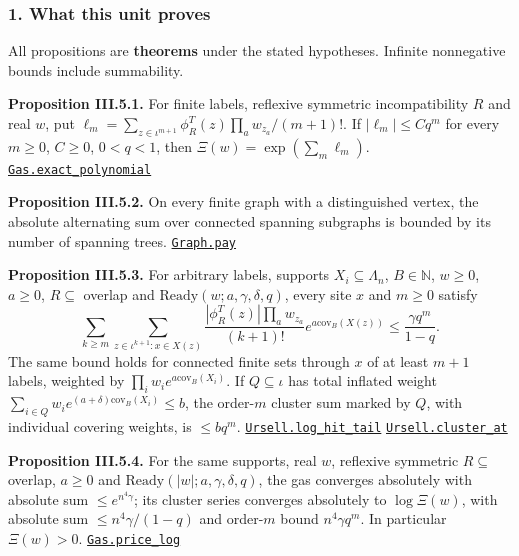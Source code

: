\documentclass[
  letterpaper,
  11pt]{article}
\begin{document}
\subsubsection{1. What this unit proves}\label{what-this-unit-proves-7}

All propositions are \textbf{theorems} under the stated hypotheses.
Infinite nonnegative bounds include summability.

\textbf{Proposition III.5.1.} For finite labels, reflexive symmetric
incompatibility \(R\) and real \(w\), put
\(\ell_m=\sum_{z\in\iota^{m+1}}\phi_R^T(z)\prod_aw_{z_a}/(m+1)!\). If
\(|\ell_m|\le Cq^m\) for every \(m\ge0\), \(C\ge0\), \(0<q<1\), then
\(\Xi(w)=\exp(\sum_m\ell_m)\).
\href{https://github.com/yang-mills-group/OpenAI-YM-20261028/blob/3456e5e75cf8d4cd558955a5c7638fba2d68f464/YM/Push/ABSOLUTE_SUMS/FiniteLog.lean\#L66-L145}{\texttt{Gas.exact\_polynomial}}

\textbf{Proposition III.5.2.} On every finite graph with a distinguished
vertex, the absolute alternating sum over connected spanning subgraphs
is bounded by its number of spanning trees.
\href{https://github.com/yang-mills-group/OpenAI-YM-20261028/blob/3456e5e75cf8d4cd558955a5c7638fba2d68f464/YM/Push/ABSOLUTE_SUMS/Graph.lean\#L113-L148}{\texttt{Graph.pay}}

\textbf{Proposition III.5.3.} For arbitrary labels, supports
\(X_i\subseteq\Lambda_n\), \(B\in\mathbb N\), \(w\ge0\), \(a\ge0\),
\(R\subseteq\) overlap and \(\mathrm{Ready}(w;a,\gamma,\delta,q)\),
every site \(x\) and \(m\ge0\) satisfy
\[\sum_{k\ge m}\sum_{z\in\iota^{k+1}:x\in X(z)}\frac{|\phi_R^T(z)|\prod_aw_{z_a}}{(k+1)!}e^{a\mathrm{cov}_B(X(z))}\le\frac{\gamma q^m}{1-q}.\]
The same bound holds for connected finite sets through \(x\) of at least
\(m+1\) labels, weighted by \(\prod_iw_ie^{a\mathrm{cov}_B(X_i)}\). If
\(Q\subseteq\iota\) has total inflated weight
\(\sum_{i\in Q}w_ie^{(a+\delta)\mathrm{cov}_B(X_i)}\le b\), the
order-\(m\) cluster sum marked by \(Q\), with individual covering
weights, is \(\le bq^m\).
\href{https://github.com/yang-mills-group/OpenAI-YM-20261028/blob/3456e5e75cf8d4cd558955a5c7638fba2d68f464/YM/Push/ABSOLUTE_SUMS/Clusters.lean\#L224-L243}{\texttt{Ursell.log\_hit\_tail}}
\href{https://github.com/yang-mills-group/OpenAI-YM-20261028/blob/3456e5e75cf8d4cd558955a5c7638fba2d68f464/YM/Push/ABSOLUTE_SUMS/Clusters.lean\#L148-L183}{\texttt{Ursell.cluster\_at}}

\textbf{Proposition III.5.4.} For the same supports, real \(w\),
reflexive symmetric \(R\subseteq\) overlap, \(a\ge0\) and
\(\mathrm{Ready}(|w|;a,\gamma,\delta,q)\), the gas converges absolutely
with absolute sum \(\le e^{n^4\gamma}\); its cluster series converges
absolutely to \(\log\Xi(w)\), with absolute sum \(\le n^4\gamma/(1-q)\)
and order-\(m\) bound \(n^4\gamma q^m\). In particular \(\Xi(w)>0\).
\href{https://github.com/yang-mills-group/OpenAI-YM-20261028/blob/3456e5e75cf8d4cd558955a5c7638fba2d68f464/YM/Push/ABSOLUTE_SUMS/Log.lean\#L114-L149}{\texttt{Gas.price\_log}}
\end{document}
